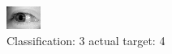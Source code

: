 \begin{figure}[h!]
\begin{center}
\includegraphics[width=0.60\columnwidth]{figures/ID3139_class_3_target_4.png}
\end{center}
\caption{ Classification: 3 actual target: 4}
\label{fig:ID3139_class_3_target_4}
\end{figure}

